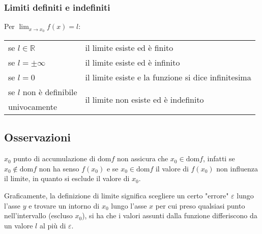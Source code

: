 \documentclass[a4paper]{article}
\newcommand\dom{\text{dom}}
\begin{document}
\subsubsection*{Limiti definiti e indefiniti}
Per \(\displaystyle \lim_{x \to x_0} f(x) = l\):
\begin{center}
	\begin{tabular}{l l}
		se \(l \in \mathbb{R}\) & il limite esiste ed è finito \\
		se \(l = \pm \infty\) & il limite esiste ed è infinito \\
		se \(l = 0\) & il limite esiste e la funzione si dice infinitesima \\
		se \(l\) non è definibile & \multirow{2}{*}{il limite non esiste ed è indefinito} \\
		univocamente &
	\end{tabular}
\end{center}


\subsection*{Osservazioni}
\(x_0\) punto di accumulazione di \(\dom f\) non assicura che \(x_0 \in \dom f\), infatti se \(x_0 \notin \dom f\) non ha senso \(f(x_0)\) e
se \(x_0 \in \dom f\) il valore di \(f(x_0)\) non influenza il limite, in quanto si esclude il valore di \(x_0\).

Graficamente, la definizione di limite significa scegliere un certo "errore" \(\varepsilon\) lungo l'asse \(y\) e trovare un intorno di \(x_0\) lungo l'asse \(x\) per cui
preso qualsiasi punto nell'intervallo (escluso \(x_0\)), si ha che i valori assunti dalla funzione differiscono da un valore \(l\) al più di \(\varepsilon\).

\newpage
\end{document}

